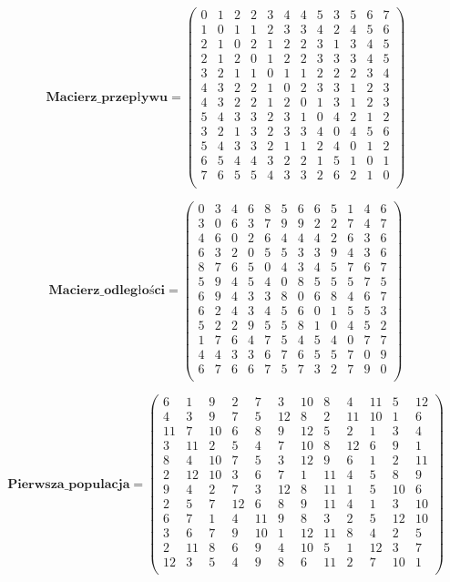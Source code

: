 \par
$$
\mathbf{Macierz\_przepływu} =
\left( \begin{array}{cccccccccccc}
0& 1& 2& 2& 3& 4& 4& 5& 3& 5& 6& 7\\
1& 0& 1& 1& 2& 3& 3& 4& 2& 4& 5& 6\\
2& 1& 0& 2& 1& 2& 2& 3& 1& 3& 4& 5\\
2& 1& 2& 0&1& 2& 2& 3& 3& 3& 4& 5\\
3& 2& 1& 1& 0& 1& 1& 2& 2& 2& 3& 4\\
4& 3& 2& 2& 1& 0& 2& 3& 3& 1& 2& 3\\
4& 3& 2& 2& 1& 2& 0& 1& 3& 1& 2 & 3\\
5& 4& 3& 3& 2& 3& 1& 0& 4& 2& 1& 2\\
3& 2& 1& 3& 2& 3& 3& 4& 0& 4& 5& 6\\
5& 4& 3& 3& 2& 1& 1& 2& 4& 0& 1& 2\\
6& 5& 4&4& 3& 2& 2& 1& 5& 1& 0& 1\\
7& 6& 5& 5& 4& 3& 3& 2& 6& 2& 1& 0 \\
\end{array} \right)
$$

\par
$$
\mathbf{Macierz\_odległości} =
\left( \begin{array}{cccccccccccc}
0&3&4&6&8&5&6&6&5&1&4&6\\
3&0&6&3&7&9&9&2&2&7&4&7\\
4&6&0&2&6&4&4&4&2&6&3&6\\
6&3&2&0&5&5&3&3&9&4&3&6\\
8&7&6&5&0&4&3&4&5&7&6&7\\
5&9&4&5&4&0&8&5&5&5&7&5\\
6&9&4&3&3&8&0&6&8&4&6&7\\
6&2&4&3&4&5&6&0&1&5&5&3\\
5&2&2&9&5&5&8&1&0&4&5&2\\
1&7&6&4&7&5&4&5&4&0&7&7\\
4&4&3&3&6&7&6&5&5&7&0&9\\
6&7&6&6&7&5&7&3&2&7&9&0\\
\end{array} \right)
$$

\par
$$
\mathbf{Pierwsza\_populacja} =
\left( \begin{array}{cccccccccccc}
6&1&9&2&7&3&10&8&4&11&5&12\\
4&3&9&7&5&12&8&2&11&10&1&6\\
11&7&10&6&8&9&12&5&2&1&3&4\\
3&11&2&5&4&7&10&8&12&6&9&1\\
8&4&10&7&5&3&12&9&6&1&2&11\\
2&12&10&3&6&7&1&11&4&5&8&9\\
9&4&2&7&3&12&8&11&1&5&10&6\\
2&5&7&12&6&8&9&11&4&1&3&10\\
6&7&1&4&11&9&8&3&2&5&12&10\\
3&6&7&9&10&1&12&11&8&4&2&5\\
2&11&8&6&9&4&10&5&1&12&3&7\\
12&3&5&4&9&8&6&11&2&7&10&1\\
\end{array} \right)
$$


